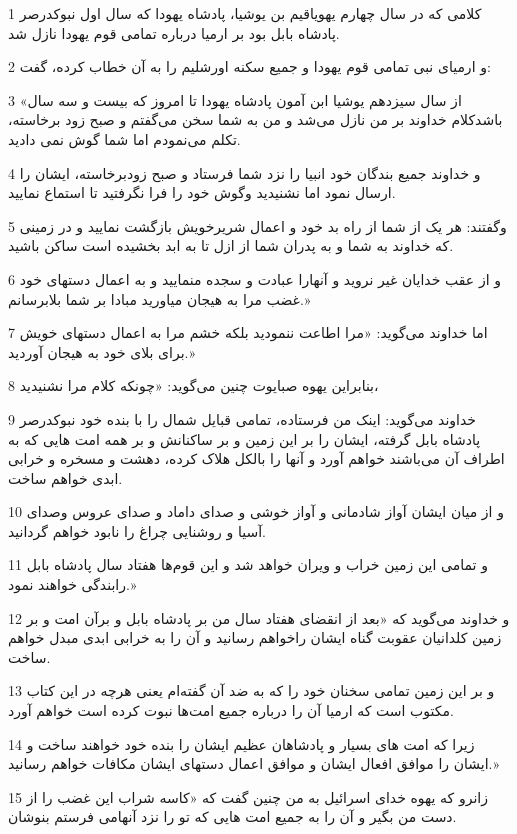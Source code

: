 \par 1 کلامی که در سال چهارم یهویاقیم بن یوشیا، پادشاه یهودا که سال اول نبوکدرصر پادشاه بابل بود بر ارمیا درباره تمامی قوم یهودا نازل شد.
\par 2 و ارمیای نبی تمامی قوم یهودا و جمیع سکنه اورشلیم را به آن خطاب کرده، گفت:
\par 3 «از سال سیزدهم یوشیا ابن آمون پادشاه یهودا تا امروز که بیست و سه سال باشدکلام خداوند بر من نازل می‌شد و من به شما سخن می‌گفتم و صبح زود برخاسته، تکلم می‌نمودم اما شما گوش نمی دادید.
\par 4 و خداوند جمیع بندگان خود انبیا را نزد شما فرستاد و صبح زودبرخاسته، ایشان را ارسال نمود اما نشنیدید وگوش خود را فرا نگرفتید تا استماع نمایید.
\par 5 وگفتند: هر یک از شما از راه بد خود و اعمال شریرخویش بازگشت نمایید و در زمینی که خداوند به شما و به پدران شما از ازل تا به ابد بخشیده است ساکن باشید.
\par 6 و از عقب خدایان غیر نروید و آنهارا عبادت و سجده منمایید و به اعمال دستهای خود غضب مرا به هیجان میاورید مبادا بر شما بلابرسانم.»
\par 7 اما خداوند می‌گوید: «مرا اطاعت ننمودید بلکه خشم مرا به اعمال دستهای خویش برای بلای خود به هیجان آوردید.»
\par 8 بنابراین یهوه صبایوت چنین می‌گوید: «چونکه کلام مرا نشنیدید،
\par 9 خداوند می‌گوید: اینک من فرستاده، تمامی قبایل شمال را با بنده خود نبوکدرصر پادشاه بابل گرفته، ایشان را بر این زمین و بر ساکنانش و بر همه امت هایی که به اطراف آن می‌باشند خواهم آورد و آنها را بالکل هلاک کرده، دهشت و مسخره و خرابی ابدی خواهم ساخت.
\par 10 و از میان ایشان آواز شادمانی و آواز خوشی و صدای داماد و صدای عروس وصدای آسیا و روشنایی چراغ را نابود خواهم گردانید.
\par 11 و تمامی این زمین خراب و ویران خواهد شد و این قوم‌ها هفتاد سال پادشاه بابل رابندگی خواهند نمود.»
\par 12 و خداوند می‌گوید که «بعد از انقضای هفتاد سال من بر پادشاه بابل و برآن امت و بر زمین کلدانیان عقوبت گناه ایشان راخواهم رسانید و آن را به خرابی ابدی مبدل خواهم ساخت.
\par 13 و بر این زمین تمامی سخنان خود را که به ضد آن گفته‌ام یعنی هر‌چه در این کتاب مکتوب است که ارمیا آن را درباره جمیع امت‌ها نبوت کرده است خواهم آورد.
\par 14 زیرا که امت های بسیار و پادشاهان عظیم ایشان را بنده خود خواهند ساخت و ایشان را موافق افعال ایشان و موافق اعمال دستهای ایشان مکافات خواهم رسانید.»
\par 15 زانرو که یهوه خدای اسرائیل به من چنین گفت که «کاسه شراب این غضب را از دست من بگیر و آن را به جمیع امت هایی که تو را نزد آنهامی فرستم بنوشان.
